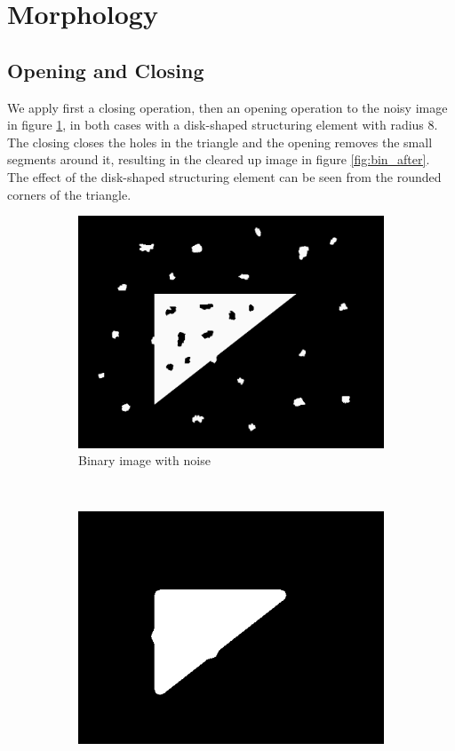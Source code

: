 \documentclass[]{article}
\begin{document}
\section{Morphology}
\subsection{Opening and Closing}
We apply first a closing operation, then an opening operation to the noisy image in figure \ref{fig:bin_before}, in both cases with a disk-shaped structuring element with radius $8$. The closing closes the holes in the triangle and the opening removes the small segments around it, resulting in the cleared up image in figure \ref{fig:bin_after}. The effect of the disk-shaped structuring element can be seen from the rounded corners of the triangle.
\begin{figure}[H]
    \centering
    \begin{subfigure}{0.5\textwidth}
        \centering
        \includegraphics[width=\textwidth]{img/before/noisy}
        \caption{Binary image with noise}
        \label{fig:bin_before}
    \end{subfigure}%
    ~
    \begin{subfigure}{0.5\textwidth}
        \centering
        \includegraphics[width=\textwidth]{img/noisy-filtered}

\end{subfigure}
\end{figure}
\end{document}
